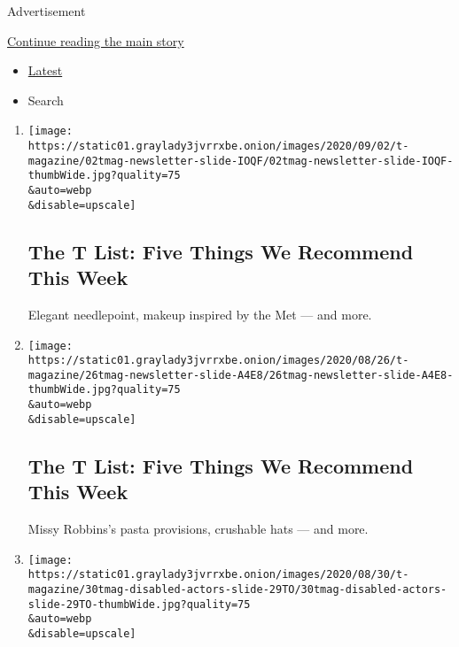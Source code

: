 Advertisement

\protect\hyperlink{after-mid1}{Continue reading the main story}

\begin{itemize}
\tightlist
\item
  \protect\hyperlink{stream-panel}{Latest}
\item
  Search
\end{itemize}

\begin{enumerate}
\def\labelenumi{\arabic{enumi}.}
\item
  \href{/2020/09/03/t-magazine/ollies-pizza-estee-lauder-met.html}{}

  \texttt{[image: https://static01.graylady3jvrrxbe.onion/images/2020/09/02/t-magazine/02tmag-newsletter-slide-IOQF/02tmag-newsletter-slide-IOQF-thumbWide.jpg?quality=75\\\&auto=webp\\\&disable=upscale]}

  \hypertarget{the-t-list-five-things-we-recommend-this-week}{%
  \subsection{The T List: Five Things We Recommend This
  Week}\label{the-t-list-five-things-we-recommend-this-week}}

  Elegant needlepoint, makeup inspired by the Met --- and more.
\item
  \href{/2020/08/27/t-magazine/misi-pasta-gregory-halpern.html}{}

  \texttt{[image: https://static01.graylady3jvrrxbe.onion/images/2020/08/26/t-magazine/26tmag-newsletter-slide-A4E8/26tmag-newsletter-slide-A4E8-thumbWide.jpg?quality=75\\\&auto=webp\\\&disable=upscale]}

  \hypertarget{the-t-list-five-things-we-recommend-this-week-1}{%
  \subsection{The T List: Five Things We Recommend This
  Week}\label{the-t-list-five-things-we-recommend-this-week-1}}

  Missy Robbins's pasta provisions, crushable hats --- and more.
\item
  \href{/2020/08/25/t-magazine/actors-disability-theater-film-tv.html}{}

  \texttt{[image: https://static01.graylady3jvrrxbe.onion/images/2020/08/30/t-magazine/30tmag-disabled-actors-slide-29TO/30tmag-disabled-actors-slide-29TO-thumbWide.jpg?quality=75\\\&auto=webp\\\&disable=upscale]}


\end{enumerate}
